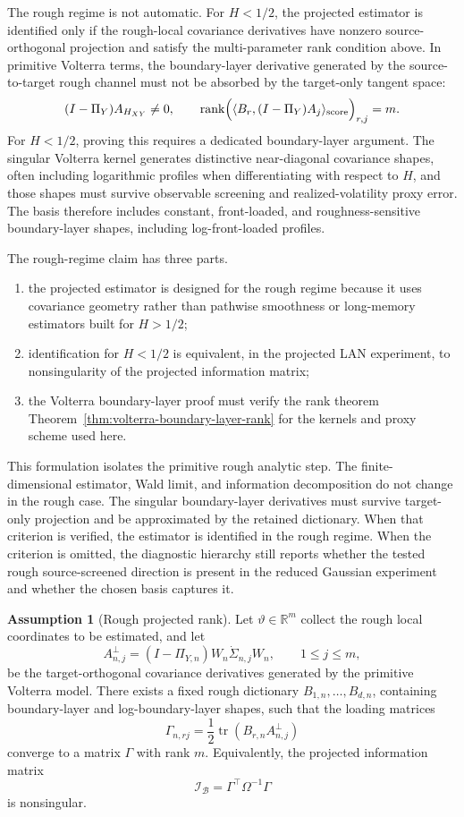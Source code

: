 \documentclass[11pt,a4paper]{amsart}
\theoremstyle{plain}
\theoremstyle{definition}
\newtheorem{assumption}[theorem]{Assumption}
\theoremstyle{remark}
\DeclareMathOperator{\tr}{tr}
\DeclareMathOperator{\rank}{rank}
\newcommand{\R}{\mathbb{R}}
\newcommand{\scrB}{\mathcal{B}}
\newcommand{\scrI}{\mathcal{I}}
\begin{document}
The rough regime is not automatic.  For \(H<1/2\), the projected estimator is identified only if
the rough-local covariance derivatives have nonzero source-orthogonal projection and satisfy the
multi-parameter rank condition above.  In primitive Volterra terms, the boundary-layer derivative
generated by the source-to-target rough channel must not be absorbed by the target-only tangent
space:
\[
        (I-\Pi_{Y})A_{H_{XY}}\neq0,
        \qquad
        \rank\Bigl(
        \langle B_r,(I-\Pi_Y)A_j\rangle_{\mathrm{score}}
        \Bigr)_{r,j}=m.
\]
For \(H<1/2\), proving this requires a dedicated boundary-layer argument.  The singular Volterra
kernel generates distinctive near-diagonal covariance shapes, often including logarithmic
profiles when differentiating with respect to \(H\), and those shapes must survive
observable screening and realized-volatility proxy error.  The basis therefore includes constant,
front-loaded, and roughness-sensitive boundary-layer shapes, including log-front-loaded profiles.

The rough-regime claim has three parts.
\begin{enumerate}[label=(\roman*)]
\item the projected estimator is designed for the rough regime because it uses covariance geometry
rather than pathwise smoothness or long-memory estimators built for \(H>1/2\);
\item identification for \(H<1/2\) is equivalent, in the projected LAN experiment, to nonsingularity
of the projected information matrix;
\item the Volterra boundary-layer proof must verify the rank theorem
Theorem~\ref{thm:volterra-boundary-layer-rank} for the kernels and proxy scheme used here.
\end{enumerate}
This formulation isolates the primitive rough analytic step.  The finite-dimensional estimator,
Wald limit, and information decomposition do not change in the rough case.  The singular
boundary-layer derivatives must survive target-only projection and be approximated by the retained
dictionary.  When that criterion is verified, the estimator is identified in the rough regime.  When
the criterion is omitted, the diagnostic hierarchy still reports whether the tested rough
source-screened direction is present in the reduced Gaussian experiment and whether the chosen basis
captures it.

\begin{assumption}[Rough projected rank]\label{ass:rough-projected-rank}
Let \(\vartheta\in\R^m\) collect the rough local coordinates to be estimated, and let
\[
        A_{n,j}^\perp=(I-\Pi_{Y,n})W_n\dot\Sigma_{n,j}W_n,
        \qquad
        1\le j\le m,
\]
be the target-orthogonal covariance derivatives generated by the primitive Volterra model.  There
exists a fixed rough dictionary \(B_{1,n},\dots,B_{d,n}\), containing boundary-layer and
log-boundary-layer shapes, such that the loading matrices
\[
        \Gamma_{n,rj}
        =
        \frac12\tr(B_{r,n}A_{n,j}^\perp)
\]
converge to a matrix \(\Gamma\) with rank \(m\).  Equivalently, the projected information matrix
\[
        \scrI_{\scrB}=\Gamma^\top\Omega^{-1}\Gamma
\]
is nonsingular.
\end{assumption}
\end{document}
